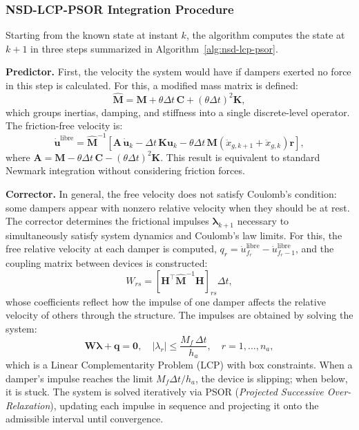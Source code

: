 \documentclass[preprint,12pt,authoryear]{elsarticle}
\newcommand{\Mf}{M_{\!f}}
\newcommand{\ha}{h_a}
\begin{document}
\subsubsection*{NSD-LCP-PSOR Integration Procedure}

Starting from the known state at instant $k$, the algorithm computes the state at $k+1$ in three
steps summarized in Algorithm~\ref{alg:nsd-lcp-psor}.

\textbf{Predictor.}
First, the velocity the system would have if dampers exerted no force in this step is calculated.
For this, a modified mass matrix is defined:
\begin{equation}
    \hat{\bm{M}} = \bm{M}
                  + \theta\Delta t\,\bm{C}
                  + (\theta\Delta t)^{2}\bm{K},
    \label{eq:Mhat}
\end{equation}
which groups inertias, damping, and stiffness into a single discrete-level operator. The friction-free
velocity is:
\begin{equation}
    \dot{\bm{u}}^{\mathrm{libre}} = \hat{\bm{M}}^{-1}
    \!\left[
        \bm{A}\,\dot{\bm{u}}_k
        - \Delta t\,\bm{K}\bm{u}_k
        - \theta\Delta t\,\bm{M}\!\left(\ddot{x}_{g,k+1}+\ddot{x}_{g,k}\right)\bm{r}
    \right],
    \label{eq:vfree}
\end{equation}
where $\bm{A} = \bm{M} - \theta\Delta t\,\bm{C} - (\theta\Delta t)^{2}\bm{K}$.
This result is equivalent to standard Newmark integration without considering friction forces.

\textbf{Corrector.}
In general, the free velocity does not satisfy Coulomb's condition: some dampers appear with nonzero
relative velocity when they should be at rest. The corrector determines the frictional impulses
$\bm{\lambda}_{k+1}$ necessary to simultaneously satisfy system dynamics and Coulomb's law limits.
For this, the free relative velocity at each damper is computed,
$q_r = \dot{u}^{\mathrm{libre}}_{f_r} - \dot{u}^{\mathrm{libre}}_{f_r-1}$,
and the coupling matrix between devices is constructed:
\begin{equation}
    W_{rs} = \left[\bm{H}^{\top}\hat{\bm{M}}^{-1}\bm{H}\right]_{rs}\Delta t,
    \label{eq:W}
\end{equation}
whose coefficients reflect how the impulse of one damper affects the relative velocity of others
through the structure. The impulses are obtained by solving the system:
\begin{equation}
    \bm{W}\bm{\lambda} + \bm{q} = \bm{0},
    \quad |\lambda_r| \leq \frac{\Mf\,\Delta t}{\ha},
    \quad r = 1,\ldots,n_a,
    \label{eq:lcp}
\end{equation}
which is a Linear Complementarity Problem (LCP) with box constraints. When a damper's impulse reaches
the limit $\Mf\Delta t/\ha$, the device is slipping; when below, it is stuck. The system is solved
iteratively via PSOR (\textit{Projected Successive Over-Relaxation}), updating each impulse in
sequence and projecting it onto the admissible interval until convergence.
\end{document}
